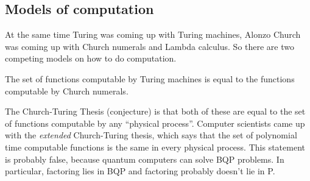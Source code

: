 \subsection*{Models of computation}
At the same time Turing was coming up with Turing machines, Alonzo Church was coming up with Church numerals and Lambda calculus. So there are two competing models on how to do computation.
\begin{theorem}
    The set of functions computable by Turing machines is equal to the functions computable by Church numerals.
\end{theorem}
The Church-Turing Thesis (conjecture) is that both of these are equal to the set of functions computable by any ``physical process''. Computer scientists came up with the \emph{extended} Church-Turing thesis, which says that the set of polynomial time computable functions is the same in every physical process. This statement is probably false, because quantum computers can solve BQP problems. In particular, factoring lies in BQP and factoring probably doesn't lie in P.
